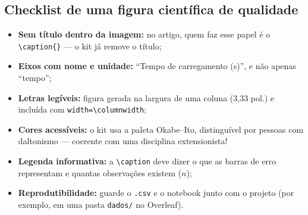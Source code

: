 \documentclass[11pt,a4paper]{article}
\begin{document}
\subsection{Checklist de uma figura científica de qualidade}
\begin{itemize}
    \item \textbf{Sem título dentro da imagem:} no artigo, quem faz esse papel é o \texttt{\textbackslash caption\{\}} --- o kit já remove o título;
    \item \textbf{Eixos com nome e unidade:} ``Tempo de carregamento (s)'', e não apenas ``tempo'';
    \item \textbf{Letras legíveis:} figura gerada na largura de uma coluna (3,33 pol.) e incluída com \texttt{width=\textbackslash columnwidth};
    \item \textbf{Cores acessíveis:} o kit usa a paleta Okabe--Ito, distinguível por pessoas com daltonismo --- coerente com uma disciplina extensionista!
    \item \textbf{Legenda informativa:} a \texttt{\textbackslash caption} deve dizer o que as barras de erro representam e quantas observações existem ($n$);
    \item \textbf{Reprodutibilidade:} guarde o \texttt{.csv} e o notebook junto com o projeto (por exemplo, em uma pasta \texttt{dados/} no Overleaf).
\end{itemize}
\end{document}
